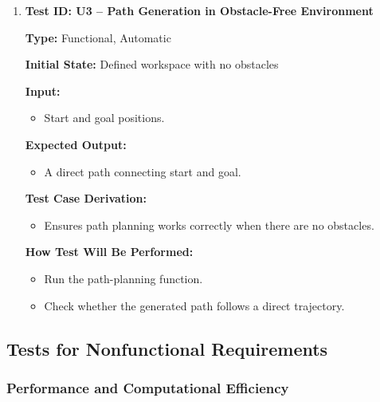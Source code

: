 \documentclass[12pt, titlepage]{article}
\begin{document}
\begin{enumerate}

\item \textbf{Test ID: U3 -- Path Generation in Obstacle-Free Environment}  

\textbf{Type:} Functional, Automatic  

\textbf{Initial State:} Defined workspace with no obstacles  

\textbf{Input:}  
\begin{itemize}
    \item Start and goal positions.
\end{itemize}

\textbf{Expected Output:}  
\begin{itemize}
    \item A direct path connecting start and goal.
\end{itemize}

\textbf{Test Case Derivation:}  
\begin{itemize}
    \item Ensures path planning works correctly when there are no obstacles.
\end{itemize}

\textbf{How Test Will Be Performed:}  
\begin{itemize}
    \item Run the path-planning function.
    \item Check whether the generated path follows a direct trajectory.
\end{itemize}
\end{enumerate}


\subsection{Tests for Nonfunctional Requirements}

\subsubsection{Performance and Computational Efficiency}
\end{document}

